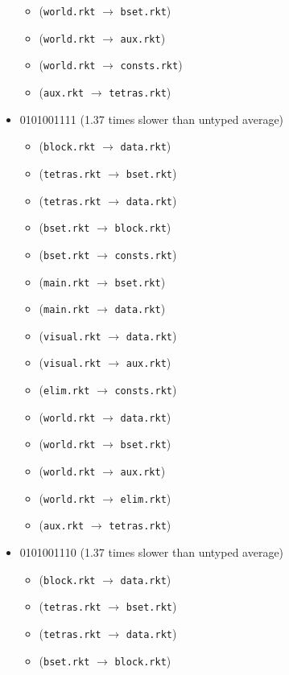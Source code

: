 \documentclass{article}
\newcommand{\mono}[1]{\texttt{#1}}
\begin{document}
\begin{itemize}
\begin{itemize}
  \item (\mono{world.rkt} $\rightarrow$ \mono{bset.rkt})
  \item (\mono{world.rkt} $\rightarrow$ \mono{aux.rkt})
  \item (\mono{world.rkt} $\rightarrow$ \mono{consts.rkt})
  \item (\mono{aux.rkt} $\rightarrow$ \mono{tetras.rkt})
  \end{itemize}
\item 0101001111 (1.37 times slower than untyped average)
  \begin{itemize}
  \item (\mono{block.rkt} $\rightarrow$ \mono{data.rkt})
  \item (\mono{tetras.rkt} $\rightarrow$ \mono{bset.rkt})
  \item (\mono{tetras.rkt} $\rightarrow$ \mono{data.rkt})
  \item (\mono{bset.rkt} $\rightarrow$ \mono{block.rkt})
  \item (\mono{bset.rkt} $\rightarrow$ \mono{consts.rkt})
  \item (\mono{main.rkt} $\rightarrow$ \mono{bset.rkt})
  \item (\mono{main.rkt} $\rightarrow$ \mono{data.rkt})
  \item (\mono{visual.rkt} $\rightarrow$ \mono{data.rkt})
  \item (\mono{visual.rkt} $\rightarrow$ \mono{aux.rkt})
  \item (\mono{elim.rkt} $\rightarrow$ \mono{consts.rkt})
  \item (\mono{world.rkt} $\rightarrow$ \mono{data.rkt})
  \item (\mono{world.rkt} $\rightarrow$ \mono{bset.rkt})
  \item (\mono{world.rkt} $\rightarrow$ \mono{aux.rkt})
  \item (\mono{world.rkt} $\rightarrow$ \mono{elim.rkt})
  \item (\mono{aux.rkt} $\rightarrow$ \mono{tetras.rkt})
  \end{itemize}
\item 0101001110 (1.37 times slower than untyped average)
  \begin{itemize}
  \item (\mono{block.rkt} $\rightarrow$ \mono{data.rkt})
  \item (\mono{tetras.rkt} $\rightarrow$ \mono{bset.rkt})
  \item (\mono{tetras.rkt} $\rightarrow$ \mono{data.rkt})
  \item (\mono{bset.rkt} $\rightarrow$ \mono{block.rkt})

\end{itemize}
\end{itemize}
\end{document}
